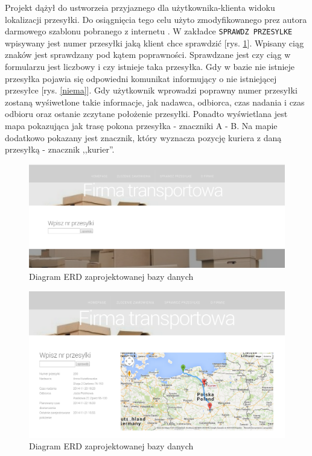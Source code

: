 \documentclass[eng,printmode,oneside]{mgr}
\begin{document}
Projekt dążył do ustworzeia przyjaznego dla użytkownika-klienta widoku
lokalizacji przesyłki. Do osiągnięcia tego celu użyto zmodyfikowanego prez
autora darmowego szablonu pobranego z internetu \cite{szablon}. W zakładce
\texttt{SPRAWDZ PRZESYLKE} wpisywany jest numer przesyłki jaką klient chce
sprawdzić [rys.
\ref{sprawdz}]. Wpisany ciąg znaków jest sprawdzany pod kątem poprawności.
Sprawdzane jest czy ciąg w formularzu jest liczbowy i czy istnieje taka
przesyłka. Gdy w bazie nie istnieje przesyłka pojawia się odpowiedni komunikat
informujący o nie istniejącej przesyłce [rys. \ref{niema}]. Gdy użytkownik
wprowadzi poprawny numer przesyłki zostaną wyśiwetlone takie informacje, jak
nadawca, odbiorca, czas nadania i czas odbioru oraz ostanie zczytane położenie
przesyłki. Ponadto wyświetlana jest mapa pokazująca jak trasę pokona przesyłka -
znaczniki A - B. Na mapie dodatkowo pokazany jest znacznik, który wyznacza
pozycję kuriera z daną przesyłką - znacznik ,,kurier''.

\begin{figure}[ht!]
\centering
\includegraphics[width=90ex]{sprawdz.png}
\caption{Diagram ERD zaprojektowanej bazy danych}
\label{sprawdz}
\end{figure}

\begin{figure}[ht!]
\centering
\includegraphics[width=90ex]{przyklad.png}
\caption{Diagram ERD zaprojektowanej bazy danych}
\label{pokaz}
\end{figure}
\end{document}
